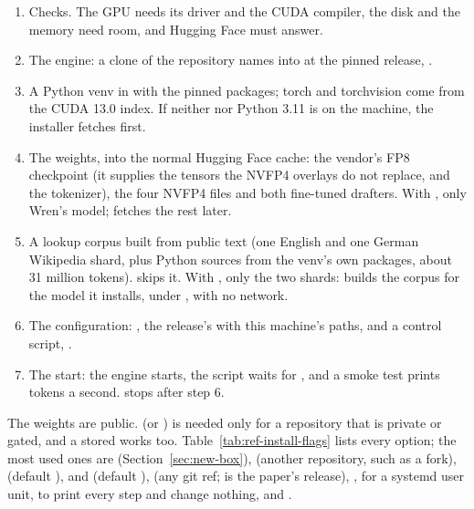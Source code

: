 \begin{enumerate}
\item Checks. The GPU needs its driver and the CUDA compiler, the disk and the memory need room, and Hugging Face must answer.
\item The engine: a clone of the repository  names into  at the pinned release, .
\item A Python venv in  with the pinned packages; torch and torchvision come from the CUDA 13.0 index. If neither  nor Python 3.11 is on the machine, the installer fetches  first.
\item The weights, into the normal Hugging Face cache: the vendor's FP8 checkpoint (it supplies the tensors the NVFP4 overlays do not replace, and the tokenizer), the four NVFP4 files and both fine-tuned drafters. With , only Wren's model;  fetches the rest later.
\item A lookup corpus built from public text (one English and one German Wikipedia shard, plus Python sources from the venv's own packages, about 31 million tokens).  skips it. With , only the two shards:  builds the corpus for the model it installs, under , with no network.
\item The configuration: , the release's  with this machine's paths, and a control script, .
\item The start: the engine starts, the script waits for , and a smoke test prints tokens a second.  stops after step 6.
\end{enumerate}

The weights are public.  (or ) is needed only for a repository that is private or gated, and a stored  works too. Table~\ref{tab:ref-install-flags} lists every option; the most used ones are  (Section~\ref{sec:new-box}),  (another repository, such as a fork),  (default ),  and  (default ),  (any git ref;  is the paper's release), ,  for a systemd user unit,  to print every step and change nothing, and .

